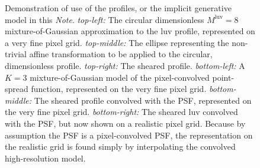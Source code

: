 \documentclass[12pt,pdftex,preprint]{aastex}
\newcommand{\documentname}{\textsl{Note}}
\newcommand{\luv}{\mathrm{luv}}
\begin{document}
\clearpage
\begin{figure}
\caption{Demonstration of use of the profiles, or the implicit
  generative model in this \documentname.  \textsl{top-left:} The
  circular dimensionless $M^{\luv}=8$ mixture-of-Gaussian
  approximation to the luv profile, represented on a very fine pixel
  grid. \textsl{top-middle:} The ellipse representing the non-trivial
  affine transformation to be applied to the circular, dimensionless
  profile.  \textsl{top-right:} The sheared profile.
  \textsl{bottom-left:} A $K=3$ mixture-of-Gaussian model of the
  pixel-convolved point-spread function, represented on the very fine
  pixel grid.  \textsl{bottom-middle:} The sheared profile convolved
  with the PSF, represented on the very fine pixel grid.
  \textsl{bottom-right:} The sheared luv convolved with the PSF, but
  now shown on a realistic pixel grid.  Because by assumption the PSF
  is a pixel-convolved PSF, the representation on the realistic grid
  is found simply by interpolating the convolved high-resolution
  model.\label{fig:example}}
\end{figure}
\end{document}
